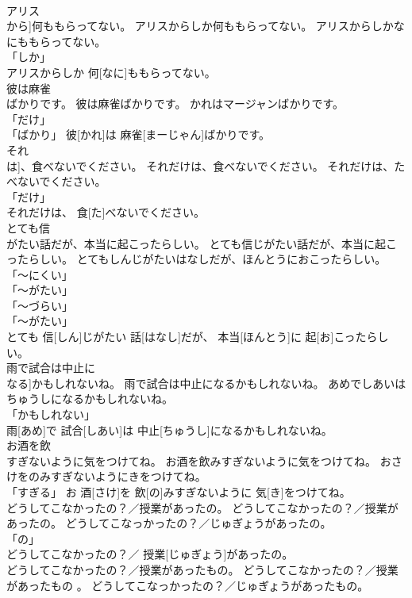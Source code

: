 \documentclass[8pt]{extreport}
\begin{document}
\begin{CJK}{UTF8}{min}
\\	アリス
\\	から]何ももらってない。	アリスからしか何ももらってない。	アリスからしかなにももらってない。	
\\	「しか」 
\\	アリスからしか 何[なに]ももらってない。		
\\	彼は麻雀
\\	ばかりです。	彼は麻雀ばかりです。	かれはマージャンばかりです。	
\\	「だけ」 
\\	「ばかり」	彼[かれ]は 麻雀[まーじゃん]ばかりです。		
\\	それ
\\	は]、食べないでください。	それだけは、食べないでください。	それだけは、たべないでください。	
\\	「だけ」 
\\	それだけは、 食[た]べないでください。		
\\	とても信
\\	がたい話だが、本当に起こったらしい。	とても信じがたい話だが、本当に起こったらしい。	とてもしんじがたいはなしだが、ほんとうにおこったらしい。	
\\	「～にくい」 
\\	「～がたい」 
\\	「～づらい」 
\\	「～がたい」 
\\	とても 信[しん]じがたい 話[はなし]だが、 本当[ほんとう]に 起[お]こったらしい。		
\\	雨で試合は中止に
\\	なる]かもしれないね。	雨で試合は中止になるかもしれないね。	あめでしあいはちゅうしになるかもしれないね。	
\\	「かもしれない」 
\\	雨[あめ]で 試合[しあい]は 中止[ちゅうし]になるかもしれないね。		
\\	お酒を飲
\\	すぎないように気をつけてね。	お酒を飲みすぎないように気をつけてね。	おさけをのみすぎないようにきをつけてね。	
\\	「すぎる」	お 酒[さけ]を 飲[の]みすぎないように 気[き]をつけてね。		
\\	どうしてこなかったの？／授業があったの。	どうしてこなかったの？／授業があったの。	どうしてこなっかったの？／じゅぎょうがあったの。	
\\	「の」 
\\	どうしてこなかったの？／ 授業[じゅぎょう]があったの。		
\\	どうしてこなかったの？／授業があったもの。	どうしてこなかったの？／授業があったもの 。	どうしてこなっかったの？／じゅぎょうがあったもの。	

\end{CJK}
\end{document}
